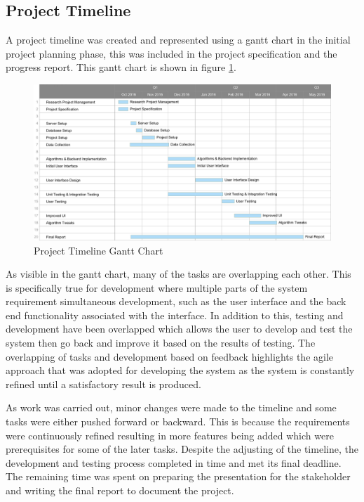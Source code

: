 \subsection{Project Timeline}
A project timeline was created and represented using a gantt chart in the initial project planning phase, this was included in the project specification and the progress report. This gantt chart is shown in figure \ref{fig:GanttChart}.
 
\begin{figure}[H]
	\centering
	\includegraphics[width=1.0\textwidth]{images/Timeline}
	\caption{Project Timeline Gantt Chart} \label{fig:GanttChart}
\end{figure}

As visible in the gantt chart, many of the tasks are overlapping each other. This is specifically true for development where multiple parts of the system requirement simultaneous development, such as the user interface and the back end functionality associated with the interface. In addition to this, testing and development have been overlapped which allows the user to develop and test the system then go back and improve it based on the results of testing. The overlapping of tasks and development based on feedback highlights the agile approach that was adopted for developing the system as the system is constantly refined until a satisfactory result is produced.

As work was carried out, minor changes were made to the timeline and some tasks were either pushed forward or backward. This is because the requirements were continuously refined resulting in more features being added which were prerequisites for some of the later tasks. Despite the adjusting of the timeline, the development and testing process completed in time and met its final deadline. The remaining time was spent on preparing the presentation for the stakeholder and writing the final report to document the project.

